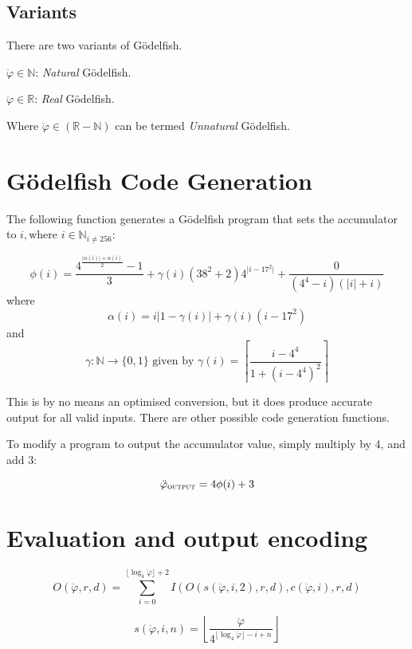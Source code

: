 \documentclass{article}
\begin{document}
\subsection{Variants}
There are two variants of Gödelfish.

$\ddot{\varphi} \in \mathbb{N}$: \textit{Natural} Gödelfish.

$\ddot{\varphi} \in \mathbb{R}$: \textit{Real} Gödelfish.

Where
$\ddot{\varphi} \in (\mathbb{R} - \mathbb{N})$ can be termed \textit{Unnatural} Gödelfish.


\section{Gödelfish Code Generation}
The following function generates a Gödelfish program that sets the accumulator to $i, \text{where } i \in \mathbb{N}_{i\ne256}$:

\[
\phi(i) = \frac{4^{\frac{\lvert\alpha(i)\rvert + \alpha(i)}{2}} - 1}{3} 
+ \gamma(i)(38^2 + 2)4^{\lvert i-17^2\rvert}
+ \frac{0}{(4^4 - i)(\lvert i \rvert + i)}
\]
where
\[
\alpha(i) = i \big\lvert 1-\gamma(i) \big\rvert
+ \gamma(i)(i - 17^{2})
\]
and
\[
\gamma: \mathbb{N} \to \{0, 1\} \text{ given by } \gamma(i) = \left\lceil\frac{i - 4^{4}}{1 + (i - 4^{4})^{2}}\right\rceil
\]


This is by no means an optimised conversion, but it does produce accurate output for all valid inputs.
There are other possible code generation functions.


To modify a program to output the accumulator value, simply multiply by 4, and add 3:

\[
	\ddot{\varphi}_{\textsc{output}} = 4\phi(i) + 3
\]

\section{Evaluation and output encoding}


\begin{equation}
	O(\ddot{\varphi}, r, d) = \sum_{i=0}^{\lfloor \log_4 \ddot{\varphi} \rfloor + 2} I(O(s(\ddot{\varphi}, i, 2), r, d), c(\ddot{\varphi}, i), r, d)
\end{equation}

\begin{equation}
	s(\ddot{\varphi}, i, n) = \left\lfloor \frac{\ddot{\varphi}}{4^{\lfloor \log_4 \ddot{\varphi} \rfloor - i + n}} \right\rfloor
\end{equation}
\end{document}
